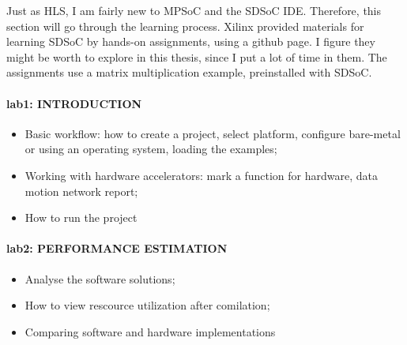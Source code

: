 Just as HLS, I am fairly new to MPSoC and the SDSoC IDE. Therefore, this section will go through the learning process. Xilinx provided materials for learning SDSoC by hands-on assignments, using a github page. I figure they might be worth to explore in this thesis, since I put a lot of time in them. The assignments use a matrix multiplication example, preinstalled with SDSoC.

\paragraph{lab1: INTRODUCTION}
\begin{itemize}
	\item Basic workflow: how to create a project, select platform, configure bare-metal or using an operating system, loading the examples;
	\item Working with hardware accelerators: mark a function for hardware, data motion network report;
	\item How to run the project
\end{itemize}

\paragraph{lab2: PERFORMANCE ESTIMATION} 
\begin{itemize}
	\item Analyse the software solutions;
	\item How to view rescource utilization after comilation; 
	\item Comparing software and hardware implementations
\end{itemize}

